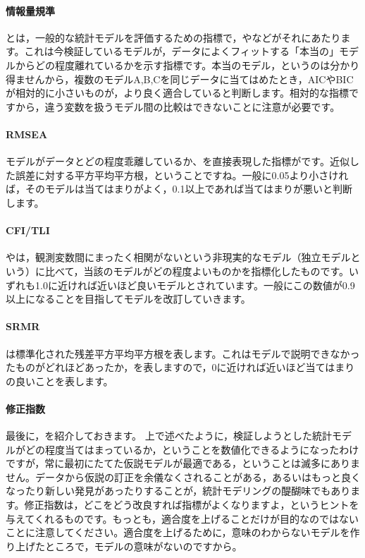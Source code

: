 \documentclass{ltjsbook}
\begin{document}
\paragraph{情報量規準}
とは，一般的な統計モデルを評価するための指標で，やなどがそれにあたります。これは今検証しているモデルが，データによくフィットする「本当の」モデルからどの程度離れているかを示す指標です。本当のモデル，というのは分かり得ませんから，複数のモデルA,B,Cを同じデータに当てはめたとき，AICやBICが相対的に小さいものが，より良く適合していると判断します。相対的な指標ですから，違う変数を扱うモデル間の比較はできないことに注意が必要です。
\paragraph{RMSEA}
モデルがデータとどの程度乖離しているか、を直接表現した指標がです。近似した誤差に対する平方平均平方根，ということですね。一般に0.05より小さければ，そのモデルは当てはまりがよく，0.1以上であれば当てはまりが悪いと判断します。
\paragraph{CFI/TLI}
やは，観測変数間にまったく相関がないという非現実的なモデル（独立モデルという）に比べて，当該のモデルがどの程度よいものかを指標化したものです。いずれも1.0に近ければ近いほど良いモデルとされています。一般にこの数値が0.9以上になることを目指してモデルを改訂していきます。
\paragraph{SRMR}
は標準化された残差平方平均平方根を表します。これはモデルで説明できなかったものがどれほどあったか，を表しますので，0に近ければ近いほど当てはまりの良いことを表します。
\paragraph{修正指数}
最後に，を紹介しておきます。
上で述べたように，検証しようとした統計モデルがどの程度当てはまっているか，ということを数値化できるようになったわけですが，常に最初にたてた仮説モデルが最適である，ということは滅多にありません。データから仮説の訂正を余儀なくされることがある，あるいはもっと良くなったり新しい発見があったりすることが，統計モデリングの醍醐味でもあります。修正指数は，どこをどう改良すれば指標がよくなりますよ，というヒントを与えてくれるものです。もっとも，適合度を上げることだけが目的なのではないことに注意してください。適合度を上げるために，意味のわからないモデルを作り上げたところで，モデルの意味がないのですから。
\end{document}
